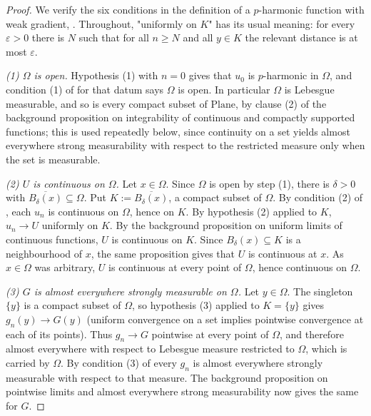 \begin{proof}
We verify the six conditions in the definition of a $p$-harmonic function with weak gradient,
.  Throughout, "uniformly on $K$" has its usual meaning: for every
$\varepsilon>0$ there is $N$ such that for all $n\ge N$ and all $y\in K$ the relevant distance
is at most $\varepsilon$.

\medskip\noindent\emph{(1) $\Omega$ is open.}
Hypothesis (1) with $n=0$ gives that $u_0$ is $p$-harmonic in $\Omega$, and condition (1) of
 for that datum says $\Omega$ is open.  In particular $\Omega$ is Lebesgue
measurable, and so is every compact subset of $\mathrm{Plane}$, by clause (2) of the background
proposition on integrability of continuous and compactly supported functions; this is used
repeatedly below, since continuity on a set yields almost everywhere strong measurability with
respect to the restricted measure only when the set is measurable.

\medskip\noindent\emph{(2) $U$ is continuous on $\Omega$.}
Let $x\in\Omega$.  Since $\Omega$ is open by step (1), there is $\delta>0$ with
$\overline{B_\delta(x)}\subseteq\Omega$.  Put $K:=\overline{B_\delta(x)}$, a compact subset of
$\Omega$.  By condition (2) of , each $u_n$ is continuous on $\Omega$, hence
on $K$.  By hypothesis (2) applied to $K$, $u_n\to U$ uniformly on $K$.  By the background
proposition on uniform limits of continuous functions, $U$ is continuous on $K$.  Since
$B_\delta(x)\subseteq K$ is a neighbourhood of $x$, the same proposition gives that $U$ is
continuous at $x$.  As $x\in\Omega$ was arbitrary, $U$ is continuous at every point of
$\Omega$, hence continuous on $\Omega$.

\medskip\noindent\emph{(3) $G$ is almost everywhere strongly measurable on $\Omega$.}
Let $y\in\Omega$.  The singleton $\{y\}$ is a compact subset of $\Omega$, so hypothesis (3)
applied to $K=\{y\}$ gives $g_n(y)\to G(y)$ (uniform convergence on a set implies pointwise
convergence at each of its points).  Thus $g_n\to G$ pointwise at every point of $\Omega$, and
therefore almost everywhere with respect to Lebesgue measure restricted to $\Omega$, which is
carried by $\Omega$.  By condition (3) of  every $g_n$ is almost everywhere
strongly measurable with respect to that measure.  The background proposition on pointwise
limits and almost everywhere strong measurability now gives the same for $G$.


\end{proof}
